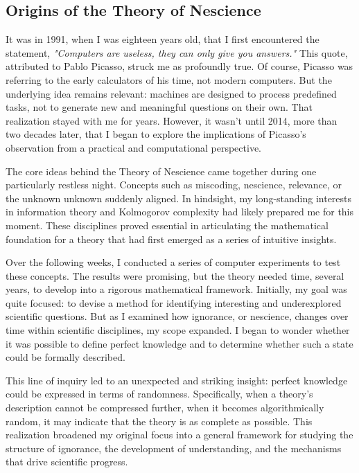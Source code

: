 %
%

\subsection*{Origins of the Theory of Nescience}

It was in 1991, when I was eighteen years old, that I first encountered the statement, \emph{"Computers are useless, they can only give you answers."} This quote, attributed to Pablo Picasso, struck me as profoundly true. Of course, Picasso was referring to the early calculators of his time, not modern computers. But the underlying idea remains relevant: machines are designed to process predefined tasks, not to generate new and meaningful questions on their own. That realization stayed with me for years. However, it wasn't until 2014, more than two decades later, that I began to explore the implications of Picasso's observation from a practical and computational perspective.

The core ideas behind the Theory of Nescience came together during one particularly restless night. Concepts such as miscoding, nescience, relevance, or the unknown unknown suddenly aligned. In hindsight, my long-standing interests in information theory and Kolmogorov complexity had likely prepared me for this moment. These disciplines proved essential in articulating the mathematical foundation for a theory that had first emerged as a series of intuitive insights.

Over the following weeks, I conducted a series of computer experiments to test these concepts. The results were promising, but the theory needed time, several years, to develop into a rigorous mathematical framework. Initially, my goal was quite focused: to devise a method for identifying interesting and underexplored scientific questions. But as I examined how ignorance, or nescience, changes over time within scientific disciplines, my scope expanded. I began to wonder whether it was possible to define perfect knowledge and to determine whether such a state could be formally described.

This line of inquiry led to an unexpected and striking insight: perfect knowledge could be expressed in terms of randomness. Specifically, when a theory's description cannot be compressed further, when it becomes algorithmically random, it may indicate that the theory is as complete as possible. This realization broadened my original focus into a general framework for studying the structure of ignorance, the development of understanding, and the mechanisms that drive scientific progress.

